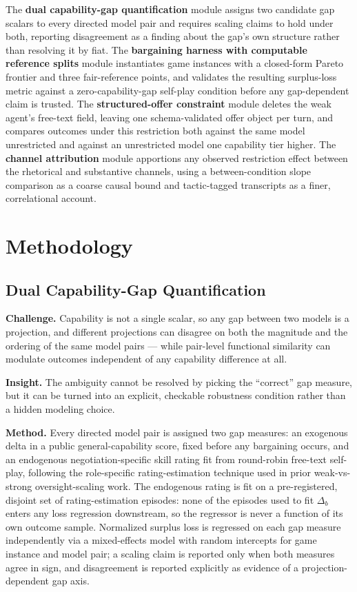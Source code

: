 \documentclass[11pt]{article}
\begin{document}
The \textbf{dual capability-gap quantification} module assigns two candidate gap scalars to every directed model pair and requires scaling claims to hold under both, reporting disagreement as a finding about the gap's own structure rather than resolving it by fiat. The \textbf{bargaining harness with computable reference splits} module instantiates game instances with a closed-form Pareto frontier and three fair-reference points, and validates the resulting surplus-loss metric against a zero-capability-gap self-play condition before any gap-dependent claim is trusted. The \textbf{structured-offer constraint} module deletes the weak agent's free-text field, leaving one schema-validated offer object per turn, and compares outcomes under this restriction both against the same model unrestricted and against an unrestricted model one capability tier higher. The \textbf{channel attribution} module apportions any observed restriction effect between the rhetorical and substantive channels, using a between-condition slope comparison as a coarse causal bound and tactic-tagged transcripts as a finer, correlational account.

\section{Methodology}

\subsection{Dual Capability-Gap Quantification}
\textbf{Challenge.} Capability is not a single scalar, so any gap between two models is a projection, and different projections can disagree on both the magnitude and the ordering of the same model pairs --- while pair-level functional similarity can modulate outcomes independent of any capability difference at all.

\textbf{Insight.} The ambiguity cannot be resolved by picking the ``correct'' gap measure, but it can be turned into an explicit, checkable robustness condition rather than a hidden modeling choice.

\textbf{Method.} Every directed model pair is assigned two gap measures: an exogenous delta in a public general-capability score, fixed before any bargaining occurs, and an endogenous negotiation-specific skill rating fit from round-robin free-text self-play, following the role-specific rating-estimation technique used in prior weak-vs-strong oversight-scaling work. The endogenous rating is fit on a pre-registered, disjoint set of rating-estimation episodes: none of the episodes used to fit $\Delta_b$ enters any loss regression downstream, so the regressor is never a function of its own outcome sample. Normalized surplus loss is regressed on each gap measure independently via a mixed-effects model with random intercepts for game instance and model pair; a scaling claim is reported only when both measures agree in sign, and disagreement is reported explicitly as evidence of a projection-dependent gap axis.
\end{document}
